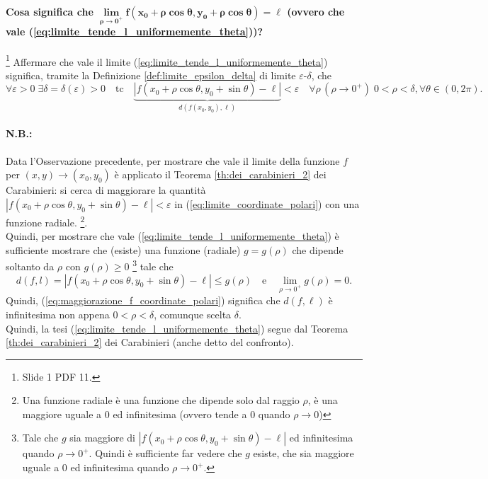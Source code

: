 \paragraph{Cosa significa che $\boldsymbol{\lim\limits_{\rho\rightarrow0^+}f(x_0+\rho\cos\theta, y_0+\rho\cos\theta)=\ell}$ (ovvero che vale (\ref{eq:limite_tende_l_uniformemente_theta}))?}

\begin{remark}\footnote{Slide 1 PDF 11.}
    Affermare che vale il limite (\ref{eq:limite_tende_l_uniformemente_theta}) significa, tramite la Definizione \ref{def:limite_epsilon_delta} di limite $\varepsilon$-$\delta$, che
    \begin{equation}\label{eq:limite_coordinate_polari}
        \forall\varepsilon>0\; \exists\delta=\delta(\varepsilon)>0\quad\text{tc}\quad \underbrace{|f(x_0+\rho\cos\theta,y_0+\sin\theta)-\ell|}_{d(f(x_0, y_0),\ell)}<\varepsilon\quad\forall\rho\,(\rho\rightarrow0^+)\;0<\rho<\delta,\forall\theta\in(0,2\pi).
    \end{equation}
\end{remark}

\paragraph{N.B.:} Data l'Osservazione precedente, per mostrare che vale il limite della funzione $f$ per $(x,y)\rightarrow (x_0,y_0)$ è applicato il Teorema \ref{th:dei_carabinieri_2} dei Carabinieri: si cerca di maggiorare la quantità $|f(x_0+\rho\cos\theta,y_0+\sin\theta)-\ell|<\varepsilon$ in (\ref{eq:limite_coordinate_polari}) con una funzione radiale. \footnote{Una funzione radiale è una funzione che dipende solo dal raggio $\rho$, è una maggiore uguale a 0 ed infinitesima (ovvero tende a 0 quando $\rho\rightarrow 0$)}.\\
Quindi, per mostrare che vale (\ref{eq:limite_tende_l_uniformemente_theta}) è sufficiente mostrare che (esiste) una funzione (radiale) $g=g(\rho)$ che dipende soltanto da $\rho$ con $g(\rho)\geq 0$ \footnote{Tale che $g$ sia maggiore di $|f(x_0+\rho\cos\theta,y_0+\sin\theta)-\ell|$ ed infinitesima quando $\rho\rightarrow 0^+$. Quindi è sufficiente far vedere che $g$ esiste, che sia maggiore uguale a 0 ed infinitesima quando $\rho\rightarrow 0^+$.} tale che
\begin{equation}\label{eq:maggiorazione_f_coordinate_polari}
    d(f,l)=|f(x_0+\rho\cos\theta,y_0+\sin\theta)-\ell|\leq g(\rho)\quad\text{e}\quad\lim\limits_{\rho\rightarrow 0^+}g(\rho)=0.
\end{equation}
Quindi, (\ref{eq:maggiorazione_f_coordinate_polari}) significa che $d(f,\ell)$ è infinitesima non appena $0<\rho<\delta$, comunque scelta $\delta$.\\
Quindi, la tesi (\ref{eq:limite_tende_l_uniformemente_theta}) segue dal Teorema \ref{th:dei_carabinieri_2} dei Carabinieri (anche detto del confronto).

